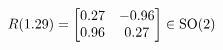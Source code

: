 \documentclass[preview]{standalone}
\begin{document}
\begin{align*}
\special{dvisvgm:raw <g id='unique000'>}R(1.29) = \begin{bmatrix} 0.27 & -0.96 \\ 0.96 & 0.27 \end{bmatrix} \in \text{SO}(2)\special{dvisvgm:raw </g>}
\end{align*}
\end{document}
